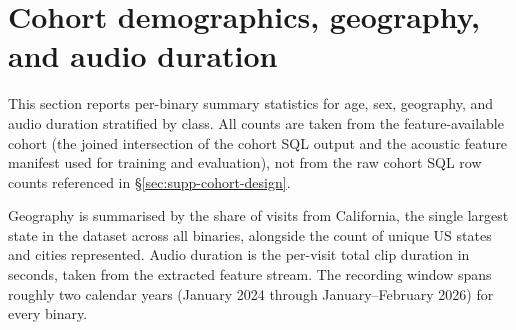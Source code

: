 \documentclass[utf8]{frontiers_suppmat} %
\begin{document}
\section{Cohort demographics, geography, and audio duration}
\label{sec:supp-cohort-demographics}

This section reports per-binary summary statistics for age, sex,
geography, and audio duration stratified by class. All counts are
taken from the feature-available cohort (the joined intersection of
the cohort SQL output and the acoustic feature manifest used for
training and evaluation), not from the raw cohort SQL row counts
referenced in \S\ref{sec:supp-cohort-design}.

Geography is summarised by the share of visits from California, the
single largest state in the dataset across all binaries, alongside
the count of unique US states and cities represented. Audio duration
is the per-visit total clip duration in seconds, taken from the
extracted feature stream. The recording window spans roughly two
calendar years (January 2024 through January--February 2026) for
every binary.
\end{document}
